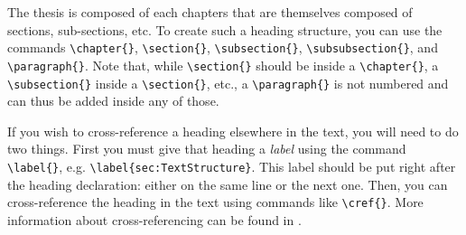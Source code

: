 \documentclass[11pt,twoside,openright]{report}
\begin{document}
The thesis is composed of each chapters that are themselves composed of sections, sub-sections, etc.
To create such a heading structure, you can use the commands \verb|\chapter{}|, \verb|\section{}|, \verb|\subsection{}|, \verb|\subsubsection{}|, and \verb|\paragraph{}|. 
Note that, while \verb|\section{}| should be inside a \verb|\chapter{}|, a \verb|\subsection{}| inside a \verb|\section{}|, etc., a \verb|\paragraph{}| is not numbered and can thus be added inside any of those.

If you wish to cross-reference a heading elsewhere in the text, you will need to do two things. 
First you must give that heading a \emph{label} using the command \verb|\label{}|, e.g. \verb|\label{sec:TextStructure}|. This label should be put right after the heading declaration: either on the same line or the next one.
Then, you can cross-reference the heading in the text using commands like \verb|\cref{}|.
More information about cross-referencing can be found in .
\end{document}
